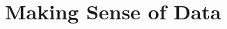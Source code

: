 \documentclass[../main]{subfiles}
\begin{document}
\chapter{Making Sense of Data} \label{chp:}
\end{document}
